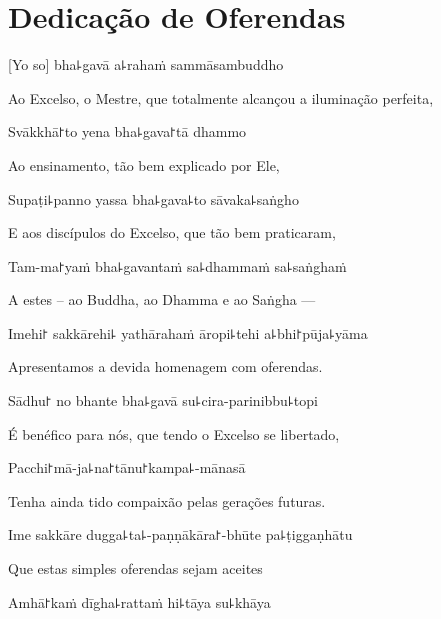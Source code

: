 \chapter{Dedicação de Oferendas}

[Yo so] bha꜕gavā a꜕rahaṁ sammāsambuddho

\begin{english}
Ao Excelso, o Mestre, que totalmente alcançou a iluminação perfeita, 
\end{english}

Svākkhā꜓to yena bha꜕gava꜓tā dhammo

\begin{english}
Ao ensinamento, tão bem explicado por Ele,
\end{english}

Supaṭi꜕panno yassa bha꜕gava꜕to sāvaka꜕saṅgho

\begin{english}
E aos discípulos do Excelso, que tão bem praticaram,
\end{english}

Tam-ma꜓yaṁ bha꜕gavantaṁ sa꜕dhammaṁ sa꜕saṅghaṁ

\begin{english}
A estes – ao Buddha, ao Dhamma e ao Saṅgha ---
\end{english}

Imehi꜓ sakkārehi꜕ yathārahaṁ āropi꜕tehi a꜕bhi꜓pūja꜕yāma

\begin{english}
Apresentamos a devida homenagem com oferendas.
\end{english}

Sādhu꜓ no bhante bha꜕gavā su꜕cira-parinibbu꜕topi

\begin{english}
É benéfico para nós, que tendo o Excelso se libertado,
\end{english}

Pacchi꜓mā-ja꜕na꜓tānu꜓kampa꜕-mānasā

\begin{english}
Tenha ainda tido compaixão pelas gerações futuras.
\end{english}

Ime sakkāre dugga꜕ta꜕-paṇṇākāra꜓-bhūte pa꜕ṭiggaṇhātu

\begin{english}
Que estas simples oferendas sejam aceites
\end{english}

Amhā꜓kaṁ dīgha꜕rattaṁ hi꜕tāya su꜕khāya

